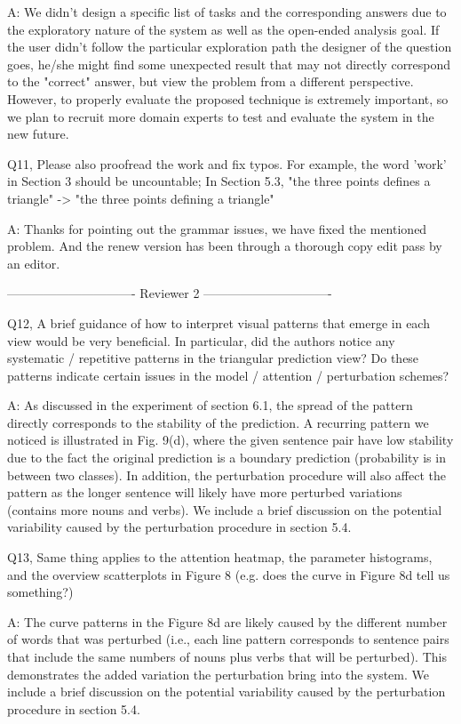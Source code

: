 A: We didn't design a specific list of tasks and the corresponding answers due to the exploratory nature of the system as well as the open-ended analysis goal. If the user didn't follow the particular exploration path the designer of the question goes, he/she might find some unexpected result that may not directly correspond to the "correct" answer, but view the problem from a different perspective. However, to properly evaluate the proposed technique is extremely important, so we plan to recruit more domain experts to test and evaluate the system in the new future.

Q11, Please also proofread the work and fix typos. For example, the word 'work' in Section 3 should be uncountable; In Section 5.3, "the three points defines a triangle" -> "the three points defining a triangle"

A: Thanks for pointing out the grammar issues, we have fixed the mentioned problem. And the renew version has been through a thorough copy edit pass by an editor.

------------------------------- Reviewer 2 -------------------------------

Q12, A brief guidance of how to interpret visual patterns that emerge in each view would be very beneficial. In particular, did the authors notice any systematic / repetitive patterns in the triangular prediction view? Do these patterns indicate certain issues in the model / attention / perturbation schemes?

A: As discussed in the experiment of section 6.1, the spread of the pattern directly corresponds to the stability of the prediction. A recurring pattern we noticed is illustrated in Fig. 9(d), where the given sentence pair have low stability due to the fact the original prediction is a boundary prediction (probability is in between two classes). In addition, the perturbation procedure will also affect the pattern as the longer sentence will likely have more perturbed variations (contains more nouns and verbs). We include a brief discussion on the potential variability caused by the perturbation procedure in section 5.4.

Q13, Same thing applies to the attention heatmap, the parameter histograms, and the overview scatterplots in Figure 8 (e.g. does the curve in Figure 8d tell us something?)

A: The curve patterns in the Figure 8d are likely caused by the different number of words that was perturbed (i.e., each line pattern corresponds to sentence pairs that include the same numbers of nouns plus verbs that will be perturbed). This demonstrates the added variation the perturbation bring into the system. We include a brief discussion on the potential variability caused by the perturbation procedure in section 5.4.

